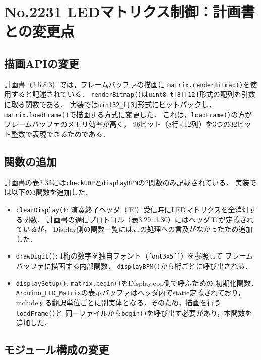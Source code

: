 \documentclass[uplatex,dvipdfmx,a4paper,11pt]{jsarticle}
\begin{document}
\section{No.2231 LEDマトリクス制御：計画書との変更点}

\subsection{描画APIの変更}

計画書（3.5.8.3）では，フレームバッファの描画に
\texttt{matrix.renderBitmap()}を使用すると記述されている．
\texttt{renderBitmap()}は\texttt{uint8\_t[8][12]}形式の配列を引数に取る関数である．
実装では\texttt{uint32\_t[3]}形式にビットパックし，
\texttt{matrix.loadFrame()}で描画する方式に変更した．
これは，\texttt{loadFrame()}の方がフレームバッファのメモリ効率が高く，
96ビット（8行$\times$12列）を3つの32ビット整数で表現できるためである．

\subsection{関数の追加}

計画書の表3.33には\texttt{checkUDP}と\texttt{displayBPM}の2関数のみ記載されている．
実装では以下の3関数を追加した．

\begin{itemize}
  \item \texttt{clearDisplay()}: 演奏終了ヘッダ（'E'）受信時にLEDマトリクスを全消灯する関数．
  計画書の通信プロトコル（表3.29, 3.30）にはヘッダ'E'が定義されているが，
  Display側の関数一覧にはこの処理への言及がなかったため追加した．

  \item \texttt{drawDigit()}: 1桁の数字を独自フォント（\texttt{font3x5[]}）を参照して
  フレームバッファに描画する内部関数．
  \texttt{displayBPM()}から桁ごとに呼び出される．

  \item \texttt{displaySetup()}: \texttt{matrix.begin()}をDisplay.cpp側で呼ぶための
  初期化関数．\texttt{Arduino\_LED\_Matrix}の表示バッファはヘッダ内でstatic定義されており，
  includeする翻訳単位ごとに別実体となる．そのため，描画を行う\texttt{loadFrame()}と
  同一ファイルから\texttt{begin()}を呼び出す必要があり，本関数を追加した．
\end{itemize}

\subsection{モジュール構成の変更}
\end{document}
